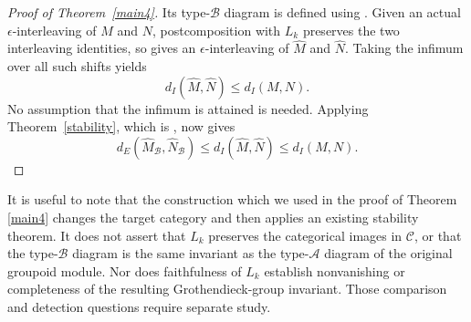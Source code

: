 \documentclass{amsart}
\begin{document}
\begin{proof}[Proof of Theorem~\ref{main4}]
Its type-$\mathcal B$ diagram is defined using \cite[Definition~6.2.1 and Definition~7.2]{patel2016generalized}. Given an actual $\epsilon$-interleaving of $M$ and $N$, postcomposition with $L_k$ preserves the two interleaving identities, so gives an $\epsilon$-interleaving of $\widehat M$ and $\widehat N$. Taking the infimum over all such shifts yields
\[
d_I(\widehat M,\widehat N)\leq d_I(M,N).
\]
No assumption that the infimum is attained is needed. Applying Theorem~\ref{stability}, which is \cite[Theorem~8.2]{patel2016generalized}, now gives
\[
d_E(\widehat M_{\mathcal B},\widehat N_{\mathcal B})
\leq d_I(\widehat M,\widehat N)
\leq d_I(M,N).
\]
\end{proof}


It is useful to note that the construction which we used in the proof of Theorem \ref{main4} changes the target category and then applies an existing stability theorem. It does not assert that $L_k$ preserves the categorical images in $\mathcal C$, or that the type-$\mathcal B$ diagram is the same invariant as the type-$\mathcal A$ diagram of the original groupoid module. Nor does faithfulness of $L_k$ establish nonvanishing or completeness of the resulting Grothendieck-group invariant. Those comparison and detection questions require separate study.



\end{document}
